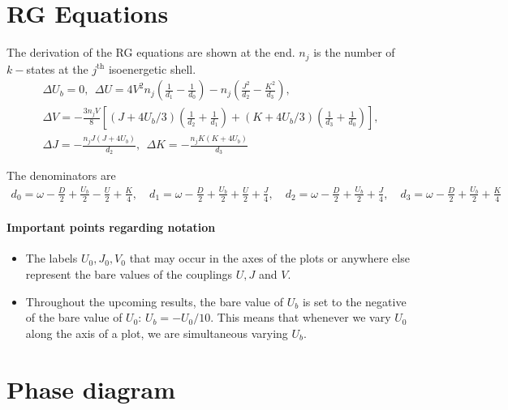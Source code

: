 \documentclass{report}
\numberwithin{equation}{section}
\begin{document}
\section{RG Equations}
The derivation of the RG equations are shown at the end. \(n_j\) is the number of \(k-\)states at the \(j^\text{th}\) isoenergetic shell. 
\begin{gather}
	\Delta U_b = 0, ~ ~\Delta U = 4V^2 n_j\left(\frac{1}{d_1} - \frac{1}{d_0}\right) - n_j\left(\frac{J^2}{d_2} - \frac{K^2}{d_3}\right),\\
	\Delta V = -\frac{3n_j V}{8}\left[\left(J + 4U_b/3\right) \left(\frac{1}{d_2} + \frac{1}{d_1}\right) + \left(K + 4U_b/3\right)\left(\frac{1}{d_3} + \frac{1}{d_0}\right)\right],\\
	\Delta J = -\frac{n_j J\left(J + 4U_b\right)}{d_2},~ ~\Delta K = -\frac{n_j K\left(K + 4U_b\right)}{d_3}
\end{gather}

The denominators are
\begin{equation}\begin{aligned}
	d_0 = \omega - \frac{D}{2} + \frac{U_b}{2} - \frac{U}{2} + \frac{K}{4}, \quad d_1 = \omega - \frac{D}{2} + \frac{U_b}{2} + \frac{U}{2} + \frac{J}{4}, \quad d_2 = \omega - \frac{D}{2} + \frac{U_b}{2} + \frac{J}{4}, \quad d_3 = \omega - \frac{D}{2} + \frac{U_b}{2} + \frac{K}{4}
\end{aligned}\end{equation}

\paragraph{Important points regarding notation}
\begin{itemize}
	\item The labels \(U_0,J_0,V_0\) that may occur in the axes of the plots or anywhere else represent the bare values of the couplings \(U,J\) and \(V\). 
	\item Throughout the upcoming results, the bare value of \(U_b\) is set to the negative of the bare value of \(U_0\): \(U_b = -U_0/10\). This means that whenever we vary \(U_0\) along the axis of a plot, we are simultaneous varying \(U_b\).	
\end{itemize}

\section{Phase diagram}
\end{document}

